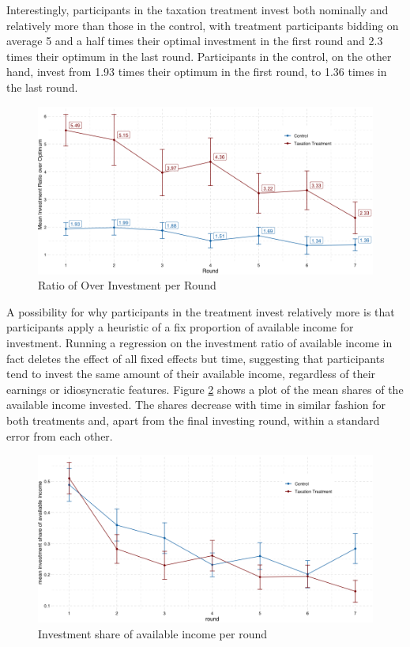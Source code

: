 Interestingly, participants in the taxation treatment invest both nominally and relatively more than those in the control, with treatment participants bidding on average 5 and a half times their optimal investment in the first round and 2.3 times their optimum in the last round. Participants in the control, on the other hand, invest from 1.93 times their optimum in the first round, to 1.36 times in the last round.\\


\begin{figure}
    \centering
    \includegraphics[width=\textwidth]{graphs/over_invest.png}
    \caption{Ratio of Over Investment per Round}
    \label{fig:over_invest}
\end{figure}


A possibility for why participants in the treatment invest relatively more is that participants apply a heuristic of a fix proportion of available income for investment. Running a regression on the investment ratio of available income in fact deletes the effect of all fixed effects but time, suggesting that participants tend to invest the same amount of their available income, regardless of their earnings or idiosyncratic features. Figure \ref{fig:invest_share} shows a plot of the mean shares of the available income invested. The shares decrease with time in similar fashion for both treatments and, apart from the final investing round, within a standard error from each other.\\

\begin{figure}
    \centering
    \includegraphics[width=\textwidth]{graphs/investment_share_geom_line.png}
    \caption{Investment share of available income per round}
    \label{fig:invest_share}
\end{figure}

